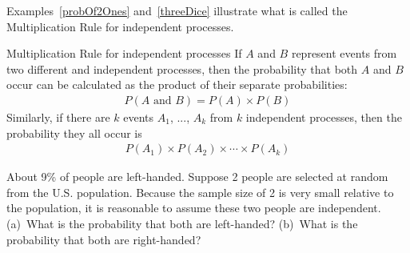 Examples~\ref{probOf2Ones} and~\ref{threeDice} illustrate what is called the Multiplication Rule for independent processes.

\begin{onebox}{Multiplication Rule for independent processes}
If $A$ and $B$ represent events from two different and independent processes, then the probability that both $A$ and $B$ occur can be calculated as the product of their separate probabilities: \vspace{-1.5mm}
\begin{eqnarray*}\label{eqForIndependentEvents}
P(A \text{ and }B) = P(A) \times  P(B)
\end{eqnarray*}
Similarly, if there are $k$ events $A_1$, ..., $A_k$ from $k$ independent processes, then the probability they all occur is\vspace{-1.5mm}
\begin{eqnarray*}
P(A_1) \times  P(A_2)\times  \cdots \times  P(A_k)
\end{eqnarray*}\vspace{-6mm}\end{onebox}

\begin{exercisewrap}
\begin{nexercise} \label{ex2Handedness}
About 9\% of people are left-handed. Suppose 2 people are selected at random from the U.S. population. Because the sample size of 2 is very small relative to the population, it is reasonable to assume these two people are independent. (a)~What is the probability that both are left-handed? (b)~What is the probability that both are right-handed?\footnotemark
\end{nexercise}
\end{exercisewrap}

